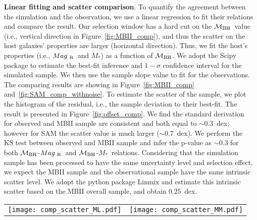 \documentclass{natureprintstyle}
\newcommand{\mbh}{$\mathcal M_{\rm BH}$}
\newcommand{\mr}{$Mag_{\rm ~R}$}
\newcommand{\mstar}{{$M_*$}}
\begin{document}

\textbf{Linear fitting and scatter comparison}.  
To quantify the agreement between the simulation and the observation, we use a linear regression to fit their relations and compare the result. Our selection window has a hard cut on the \mbh\ value (i.e., vertical direction in Figure~\ref{fig:MBII_comp}), and thus the scatter on the host galaxies' properties are larger (horizontal direction). Thus, we fit the host's properties (i.e., \mr\ and \mstar) as a function of \mbh. We adopt the {\sc Scipy} package to estimate the best-fit inference and $1-\sigma$ confidence interval for the simulated sample. We then use the sample slope value to fit for the observations. The comparing results are showing in Figure~\ref{fig:MBII_comp} and~\ref{fig:SAM_comp_withnoise}. To estimate the scatter of the sample, we plot the histogram of the residual, i.e., the sample deviation to their best-fit. The result is presented in Figure~\ref{fig:offset_comp}. We find the standard derivation for observed and MBII sample are consistent and both equal to $\sim0.3$~dex; however for SAM the scatter value is much larger ($\sim0.7$~dex).  We perform the KS test between observed and MBII sample and infer the p-value as $\sim0.3$ for both \mbh-\mr\ and \mbh-\mstar\ relations. Considering that the simulation sample has been processed to have the same uncertainty level and selection effect, we expect the MBII sample and the observational sample have the same intrinsic scatter level. We adopt the python package {\sc Linmix} and estimate this intrinsic scatter based on the MBII overall sample, and obtain $0.25$~dex. 

\begin{figure*}[t]%
\begin{tabular}{c c}
\texttt{[image: comp\_scatter\_ML.pdf]} &
\texttt{[image: comp\_scatter\_MM.pdf]} \\
\end{tabular}
\caption{The histogram comparison of the scatter using residual value when fit as linear. The standard derivations for these distribution are $\sim0.3$~dex, $\sim0.3$~dex and $\sim0.7$~dex for observed sample, MBII sample and SAM sample, respectively. Compared to the observation and MBII, the scatters are much larger in SAM's prediction. 
}
\label{fig:offset_comp}
\end{figure*}
\end{document}
